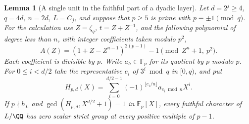\documentclass[a4paper,11pt]{article}
\newtheorem{lemma}[proposition]{Lemma}
\theoremstyle{definition}
\theoremstyle{remark}
\numberwithin{equation}{section}
\begin{document}
\begin{lemma}[A single unit in the faithful part of a dyadic layer]
\leavevmode\label{lem:dyadicpolynomial524}
Let \(d=2^j\ge4\), \(q=4d\), \(n=2d\), \(L=C_j\), and suppose that
\(p\ge5\) is prime with \(p\equiv\pm1\pmod q\). For the calculation
use \(Z=\zeta_q\), \(t=Z+Z^{-1}\), and the following polynomial of
degree less than \(n\), with integer coefficients taken modulo \(p^2\),
\[
     A(Z)=(1+Z-Z^{n-1})^{2(p-1)}-1
                  \pmod{Z^n+1,\ p^2}.
\]
Each coefficient is divisible by \(p\). Write \(a_h\in\mathbb F_p\)
for its quotient by \(p\) modulo \(p\). For \(0\le i<d/2\) take the
representative \(e_i\) of \(3^i\bmod q\) in \([0,q)\), and put
\[
       H_{p,d}(X)=\sum_{i=0}^{d/2-1}
             (-1)^{\lfloor e_i/n\rfloor}a_{e_i\bmod n} X^i .
\]
If \(p\nmid h_L\) and \(\gcd(H_{p,d},X^{d/2}+1)=1\) in
\(\mathbb F_p[X]\), every faithful character of \(L/\QQ\) has zero
scalar strict group at every positive multiple of \(p-1\).
\end{lemma}
\end{document}
